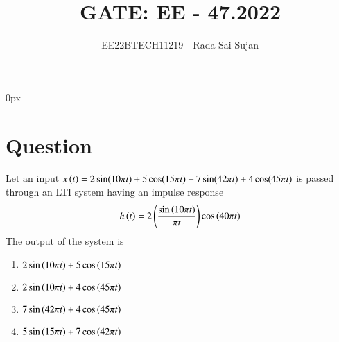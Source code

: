 \documentclass[journal,12pt,twocolumn]{IEEEtran}
\theoremstyle{remark}
\begin{document}
\parindent 0px

\title{GATE: EE - 47.2022}
\author{EE22BTECH11219 - Rada Sai Sujan$^{}$%
}
\maketitle
\newpage
\bigskip
\section*{Question}
Let an input $x\left(t\right)=2\sin (10\pi t )+5\cos (15\pi t)+7\sin(42\pi t)+4\cos (45\pi t)$ is passed through an LTI system having an impulse response $$h\left(t\right)=2\left(\frac{\sin\left(10\pi t\right)}{\pi t}\right)\cos \left(40\pi t\right)$$ The output of the system is \\
\begin{enumerate}[label=(\alph*)]
    \item $2\sin\left(10\pi t\right)+5\cos\left(15\pi t\right)$
    \item $2\sin\left(10\pi t\right)+4\cos\left(45\pi t\right)$
    \item $7\sin\left(42\pi t\right)+4\cos\left(45\pi t\right)$
    \item $5\sin\left(15\pi t\right)+7\cos\left(42\pi t\right)$
\end{enumerate}
\solution
\fi
\end{document}
